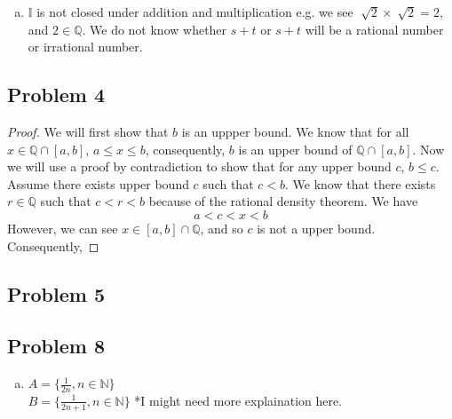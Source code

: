 \documentclass[12pt]{article}
\begin{document}
\begin{enumerate}[a).]
{        \begin{proof}
            We will use contradiction to show that if $a \in \mathbb{Q}$ and $t \in \mathbb{I}$, then $at \in \mathbb{I}$. 
            Assume not, that is, $a \in \mathbb{Q}$, $t \in \mathbb{I}$, and $at \in \mathbb{Q}$. 
            Because $at \in \mathbb{Q}$, $at = \frac{p}{q}$ for $p,q \in \mathbb{Z}$ and $q \ne 0$. 
            In addition, because $a \in \mathbb{Q}$, $a = \frac{c}{d}$ for $c, d \in \mathbb{Z}$ and $d \ne 0$. 
            We see 
            \begin{align*}
                at &= at\\
                \frac{c}{d}t &= \frac{p}{q}\\
                t &= \frac{pc}{qd}\\
            \end{align*}
            Because $pc, pd \in \mathbb{Z}$ and $pd \ne 0$, we know that $t \in \mathbb{Q}$.
            Thus we have arrived at our contradiction because we know that $t \in \mathbb{R}$. 
        \end{proof}
    }
    \item {
        $\mathbb{I}$ is not closed under addition and multiplication
        e.g. we see $\sqrt[]{2} \times \sqrt[]{2} = 2$, and $2 \in \mathbb{Q}$. 
        We do not know whether $s+t$ or $s+t$ will be a rational number or irrational number. 
    }
\end{enumerate}

\subsection*{Problem 4}
\begin{proof}
    We will first show that $b$ is an uppper bound.
    We know that for all $x \in \mathbb{Q} \cap [a,b]$, $a \le x \le b$, consequently, $b$ is an upper bound of $\mathbb{Q} \cap [a,b]$. 
    Now we will use a proof by contradiction to show that for any upper bound $c$, $b \le c$. 
    Assume there exists upper bound $c$ such that $c < b$. 
    We know that there exists $r \in \mathbb{Q}$ such that $c < r < b$ because of the rational density theorem. 
    We have $$a < c < x < b$$
    However, we can see $x \in [a,b] \cap \mathbb{Q}$, and so $c$ is not a upper bound. 
    Consequently, 
    
\end{proof}

\subsection*{Problem 5}
\subsection*{Problem 8}
\begin{enumerate}[a).]
    \item {
    $A = \{ \frac{1}{2n}, n \in \mathbb{N}\}$\\
    $B = \{ \frac{1}{2n+1}, n \in \mathbb{N}\}$
    *I might need more explaination here.
    }
\end{enumerate}
\end{document}
